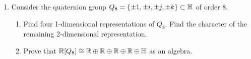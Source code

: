 \documentclass[../psets.tex]{subfiles}
\begin{document}
\begin{enumerate}
\begin{enumerate}
    \end{enumerate}
    \item Consider the quaternion group $Q_8=\{\pm 1,\pm i,\pm j,\pm k\}\subset\mathbb{H}$ of order 8.
    \begin{enumerate}
        \item Find four 1-dimensional representations of $Q_8$. Find the character of the remaining 2-dimensional representation.
        \item Prove that $\mathbb{R}[Q_8]\cong\mathbb{R}\oplus\mathbb{R}\oplus\mathbb{R}\oplus\mathbb{R}\oplus\mathbb{H}$ as an algebra.
    \end{enumerate}
\end{enumerate}
\end{document}
